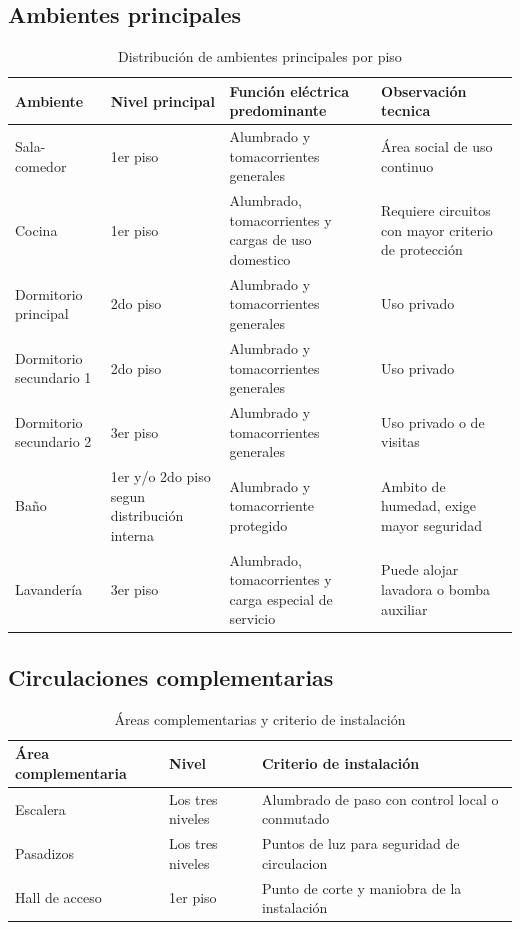 \subsection{Ambientes principales}

\begin{table}[H]
\centering
\small
\caption{Distribución de ambientes principales por piso}
\label{tab:ambientes-principales}
\begin{tabularx}{\textwidth}{p{3.4cm}p{2.0cm}p{4.3cm}>{\raggedright\arraybackslash}X}
\toprule
\textbf{Ambiente} & \textbf{Nivel principal} & \textbf{Función eléctrica predominante} & \textbf{Observación tecnica} \\
\midrule
Sala-comedor & 1er piso & Alumbrado y tomacorrientes generales & Área social de uso continuo \\
Cocina & 1er piso & Alumbrado, tomacorrientes y cargas de uso domestico & Requiere circuitos con mayor criterio de protección \\
Dormitorio principal & 2do piso & Alumbrado y tomacorrientes generales & Uso privado \\
Dormitorio secundario 1 & 2do piso & Alumbrado y tomacorrientes generales & Uso privado \\
Dormitorio secundario 2 & 3er piso & Alumbrado y tomacorrientes generales & Uso privado o de visitas \\
Baño & 1er y/o 2do piso segun distribución interna & Alumbrado y tomacorriente protegido & Ambito de humedad, exige mayor seguridad \\
Lavandería & 3er piso & Alumbrado, tomacorrientes y carga especial de servicio & Puede alojar lavadora o bomba auxiliar \\
\bottomrule
\end{tabularx}
\end{table}

\subsection{Circulaciones complementarias}

\begin{table}[H]
\centering
\small
\caption{Áreas complementarias y criterio de instalación}
\label{tab:circulaciones}
\begin{tabularx}{\textwidth}{p{3.4cm}p{2.2cm}>{\raggedright\arraybackslash}X}
\toprule
\textbf{Área complementaria} & \textbf{Nivel} & \textbf{Criterio de instalación} \\
\midrule
Escalera & Los tres niveles & Alumbrado de paso con control local o conmutado \\
Pasadizos & Los tres niveles & Puntos de luz para seguridad de circulacion \\
Hall de acceso & 1er piso & Punto de corte y maniobra de la instalación \\
\bottomrule
\end{tabularx}
\end{table}
